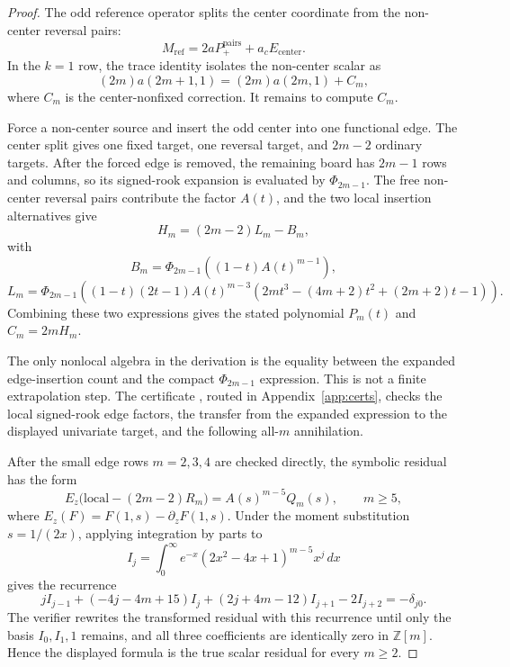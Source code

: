 \begin{proof}
The odd reference operator splits the center coordinate from the non-center reversal pairs:
\[
  M_{\mathrm{ref}}=2aP_+^{\mathrm{pairs}}+a_cE_{\mathrm{center}}.
\]
In the $k=1$ row, the trace identity isolates the non-center scalar as
\[
  (2m)a(2m+1,1)=(2m)a(2m,1)+C_m,
\]
where $C_m$ is the center-nonfixed correction.  It remains to compute $C_m$.

Force a non-center source and insert the odd center into one functional edge.  The center split gives one fixed target,
one reversal target, and $2m-2$ ordinary targets.  After the forced edge is removed, the remaining board has
$2m-1$ rows and columns, so its signed-rook expansion is evaluated by $\Phi_{2m-1}$.  The free non-center reversal
pairs contribute the factor $A(t)$, and the two local insertion alternatives give
\[
H_m=(2m-2)L_m-B_m,
\]
with
\[
B_m=\Phi_{2m-1}\left((1-t)A(t)^{m-1}\right),
\]
\[
L_m=\Phi_{2m-1}\left((1-t)(2t-1)A(t)^{m-3}
      (2m t^3-(4m+2)t^2+(2m+2)t-1)\right).
\]
Combining these two expressions gives the stated polynomial $P_m(t)$ and $C_m=2mH_m$.

The only nonlocal algebra in the derivation is the equality between the expanded edge-insertion count and the compact
$\Phi_{2m-1}$ expression.  This is not a finite extrapolation step.  The certificate
, routed in Appendix~\ref{app:certs}, checks the local signed-rook
edge factors, the transfer from the expanded expression to the displayed univariate target, and the following all-$m$
annihilation.

After the small edge rows $m=2,3,4$ are checked directly, the symbolic residual has the form
\[
  E_z\bigl(\mathrm{local}-(2m-2)R_m\bigr)=A(s)^{m-5}Q_m(s),\qquad m\ge5,
\]
where $E_z(F)=F(1,s)-\partial_zF(1,s)$.  Under the moment substitution $s=1/(2x)$, applying
integration by parts to
\[
  I_j=\int_0^\infty e^{-x}(2x^2-4x+1)^{m-5}x^j\,dx
\]
gives the recurrence
\[
 j I_{j-1}+(-4j-4m+15)I_j+(2j+4m-12)I_{j+1}-2I_{j+2}=-\delta_{j0}.
\]
The verifier rewrites the transformed residual with this recurrence until only the basis $I_0,I_1,1$ remains, and all
three coefficients are identically zero in $\mathbb Z[m]$.  Hence the displayed formula is the true scalar residual for
every $m\ge2$.
\end{proof}
